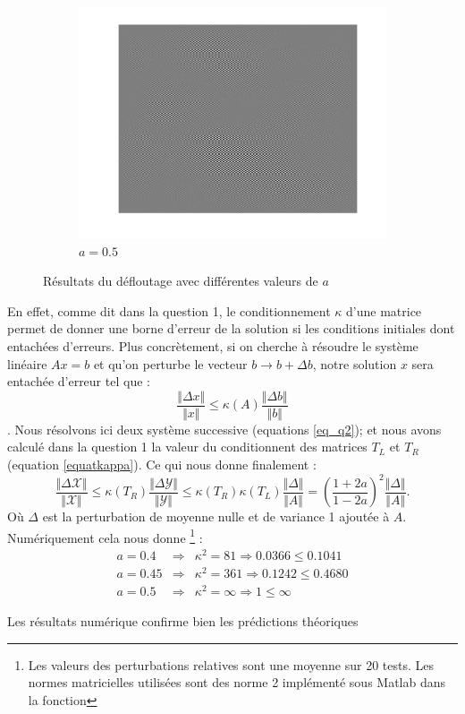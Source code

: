 \begin{figure}
\begin{subfigure}[b]{0.3\textwidth}
    \includegraphics[width=\textwidth]{Q2/unblurred_50.png}
    \caption{$a = 0.5$}
    \label{fig:a5}
  \end{subfigure}
  \caption{Résultats du défloutage avec différentes valeurs de $a$}\label{fig:adiff}
\end{figure}



En effet, comme dit dans la question 1, le conditionnement $\kappa$ d'une matrice permet de donner une borne d'erreur de la solution si les conditions initiales dont entachées d'erreurs. Plus concrètement, si on cherche à résoudre le système linéaire $Ax=b$ et qu'on perturbe le vecteur $b\rightarrow b+\Delta b$, notre solution $x$ sera entachée d'erreur tel que : 
$$\frac{\Vert \Delta x \Vert}{\Vert x \Vert} \leq \kappa(A) \frac{\Vert \Delta b \Vert}{\Vert b \Vert} $$. 
Nous résolvons ici deux système successive (equations \ref{eq_q2}); et nous avons calculé dans la question 1 la valeur du conditionnent des matrices $T_L$ et $T_R$ (equation \ref{equatkappa}). Ce qui nous donne finalement : 
$$\frac{\Vert \Delta \mathcal{X} \Vert}{\Vert \mathcal{X} \Vert} \leq \kappa (T_R) \frac{\Vert \Delta \mathcal{Y} \Vert}{\Vert \mathcal{Y} \Vert} \leq \kappa(T_R) \kappa (T_L) \frac{\Vert \Delta \Vert}{\Vert A \Vert} = \left(\frac{1+2a}{1-2a}\right)^2  \frac{\Vert \Delta \Vert}{\Vert A \Vert}. $$
Où $\Delta$ est la perturbation de moyenne nulle et de variance 1 ajoutée à $A$. Numériquement cela nous donne \footnote{Les valeurs des perturbations relatives sont une moyenne sur 20 tests. Les normes matricielles utilisées sont des norme 2 implémenté sous Matlab dans la fonction } : 
\begin{eqnarray}
a=0.4  &\Longrightarrow & \kappa^2 = 81 \Longrightarrow 0.0366 \leq  0.1041\\
a=0.45  &\Longrightarrow & \kappa^2 = 361 \Longrightarrow  0.1242 \leq  0.4680\\
a=0.5  &\Longrightarrow &  \kappa^2 = \infty \Longrightarrow 1 \leq \infty 
\end{eqnarray}

Les résultats numérique confirme bien les prédictions théoriques













